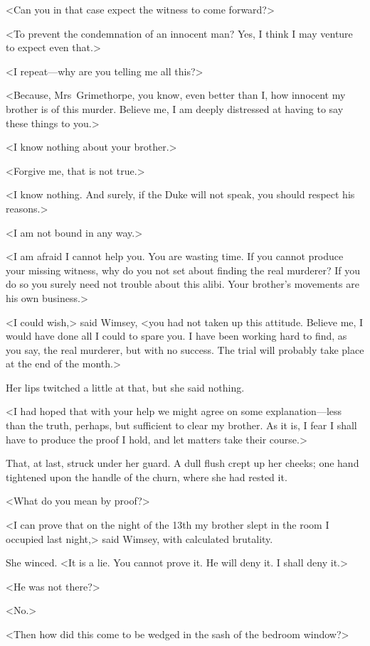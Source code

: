 <Can you in that case expect the witness to come forward?>

<To prevent the condemnation of an innocent man? Yes, I think I may venture to expect even that.>

<I repeat—why are you telling me all this?>

<Because, Mrs~Grimethorpe, you know, even better than I, how innocent my brother is of this murder. Believe me, I am deeply distressed at having to say these things to you.>

<I know nothing about your brother.>

<Forgive me, that is not true.>

<I know nothing. And surely, if the Duke will not speak, you should respect his reasons.>

<I am not bound in any way.>

<I am afraid I cannot help you. You are wasting time. If you cannot produce your missing witness, why do you not set about finding the real murderer? If you do so you surely need not trouble about this alibi.  Your brother's movements are his own business.>

<I could wish,> said Wimsey, <you had not taken up this attitude.  Believe me, I would have done all I could to spare you. I have been working hard to find, as you say, the real murderer, but with no success. The trial will probably take place at the end of the month.>

Her lips twitched a little at that, but she said nothing.

<I had hoped that with your help we might agree on some explanation—less than the truth, perhaps, but sufficient to clear my brother. As it is, I fear I shall have to produce the proof I hold, and let matters take their course.>

That, at last, struck under her guard. A dull flush crept up her cheeks; one hand tightened upon the handle of the churn, where she had rested it.

<What do you mean by proof?>

<I can prove that on the night of the 13th my brother slept in the room I occupied last night,> said Wimsey, with calculated brutality.

She winced. <It is a lie. You cannot prove it. He will deny it. I shall deny it.>

<He was not there?>

<No.>

<Then how did this come to be wedged in the sash of the bedroom window?>

